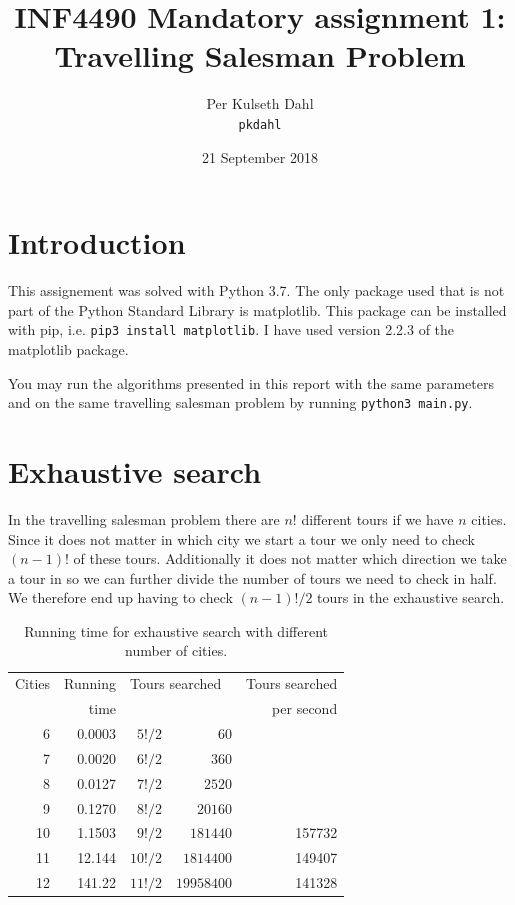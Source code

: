 \documentclass[a4paper]{article}
\title{INF4490 Mandatory assignment 1: \\
  Travelling Salesman Problem}
\author{Per Kulseth Dahl \\
{\tt pkdahl}}
\date{21 September 2018}
\begin{document}
\maketitle

\section*{Introduction}

This assignement was solved with Python 3.7. The only package used
that is not part of the Python Standard Library is matplotlib.
This package can be installed with pip, i.e. {\tt pip3 install matplotlib}.
I have used version 2.2.3 of the matplotlib package.

You may run the algorithms presented in this report with the same parameters and
on the same travelling salesman problem by running {\tt python3 main.py}.

\section*{Exhaustive search}

In the travelling salesman problem there are $n!$ different tours if we
have $n$ cities. Since it does not matter in which city we start a tour we
only need to check $(n-1)!$ of these tours. Additionally it does not matter
which direction we take a tour in so we can further divide the number of
tours we need to check in half. We therefore end up having to check
$(n-1)!/2$ tours in the exhaustive search.

\begin{table}[h]
  \centering
  \begin{tabular}{rrr@{ = }rr}
    Cities & Running & \multicolumn{2}{l}{Tours searched} & Tours searched \\
    & time & \multicolumn{2}{c}{} & per second \\
    \hline
    6 &   0.0003 & $5!/2$ & $60$ \\
    7 &   0.0020 & $6!/2$ & $360$ \\
    8 &   0.0127 & $7!/2$ & $2520$ \\
    9 &   0.1270 & $8!/2$ & $20160$ \\
    10 &  1.1503 & $9!/2$ & $181440$ & 157732 \\
    11 &  12.144 & $10!/2$ & $1814400$ & 149407 \\
    12 &  141.22 & $11!/2$ & $19958400$ & 141328 \\
  \end{tabular}
  \caption{Running time for exhaustive search with different number of cities.}
\end{table}
\end{document}
